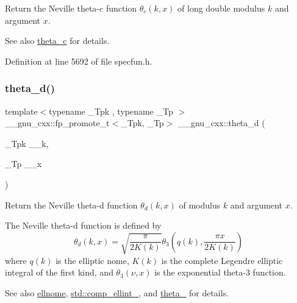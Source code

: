 Return the Neville theta-\/c function $ \theta_c(k,x) $ of {\ttfamily long double} modulus $ k $ and argument $ x $.

\begin{DoxySeeAlso}{See also}
\hyperlink{group__gnu__math__spec__func_ga3ebbb6513c39e1d55b08cba7d169ce3d}{theta\+\_\+c} for details. 
\end{DoxySeeAlso}


Definition at line 5692 of file specfun.\+h.

\mbox{\label{group__gnu__math__spec__func_ga258edb995137d9e6344b3cd750266d74}} 
\subsubsection{\texorpdfstring{theta\+\_\+d()}{theta\_d()}}
{\footnotesize\ttfamily template$<$typename \+\_\+\+Tpk , typename \+\_\+\+Tp $>$ \\
\+\_\+\+\_\+gnu\+\_\+cxx\+::fp\+\_\+promote\+\_\+t$<$\+\_\+\+Tpk, \+\_\+\+Tp$>$ \+\_\+\+\_\+gnu\+\_\+cxx\+::theta\+\_\+d (\begin{DoxyParamCaption}\item[{\+\_\+\+Tpk}]{\+\_\+\+\_\+k,  }\item[{\+\_\+\+Tp}]{\+\_\+\+\_\+x }\end{DoxyParamCaption})\hspace{0.3cm}{\ttfamily [inline]}}

Return the Neville theta-\/d function $ \theta_d(k,x) $ of modulus $ k $ and argument $ x $.

The Neville theta-\/d function is defined by \[ \theta_d(k,x) = \sqrt{\frac{\pi}{2K(k)}} \theta_3\left(q(k),\frac{\pi x}{2K(k)}\right) \] where $ q(k) $ is the elliptic nome, $ K(k) $ is the complete Legendre elliptic integral of the first kind, and $ \theta_3(\nu,x) $ is the exponential theta-\/3 function. \begin{DoxySeeAlso}{See also}
\hyperlink{group__gnu__math__spec__func_ga7bfb34f8b5c0ed7c72040f9cb7034bba}{ellnome}, \hyperlink{group__tr29124__math__spec__func_gad559217fb01e7a8b7a6e23eeedda64be}{std\+::comp\+\_\+ellint\+\_}, and \hyperlink{group__gnu__math__spec__func_ga146c3b8e86991e164d4bf143cda5f0fc}{theta\+\_} for details.
\end{DoxySeeAlso}

